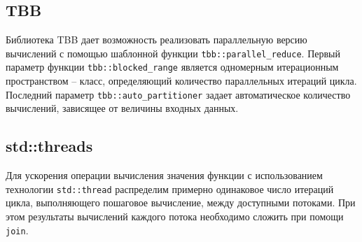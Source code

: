 \documentclass{report}
\begin{document}
\subsection*{TBB}
\par Библиотека TBB дает возможность реализовать параллельную версию вычислений с помощью шаблонной функции \verb|tbb::parallel_reduce|.
Первый параметр функции \verb|tbb::blocked_range| является одномерным итерационным пространством – класс, определяющий количество параллельных итераций цикла. Последний параметр \verb|tbb::auto_partitioner| задает автоматическое количество вычислений, зависящее от величины входных данных.
\subsection*{std::threads}
Для ускорения операции вычисления значения функции с использованием технологии \verb|std::thread| распределим примерно одинаковое число итераций цикла, выполняющего пошаговое вычисление, между доступными потоками. При этом результаты вычислений 
каждого потока необходимо сложить при помощи \verb|join|.
\newpage

\end{document}

